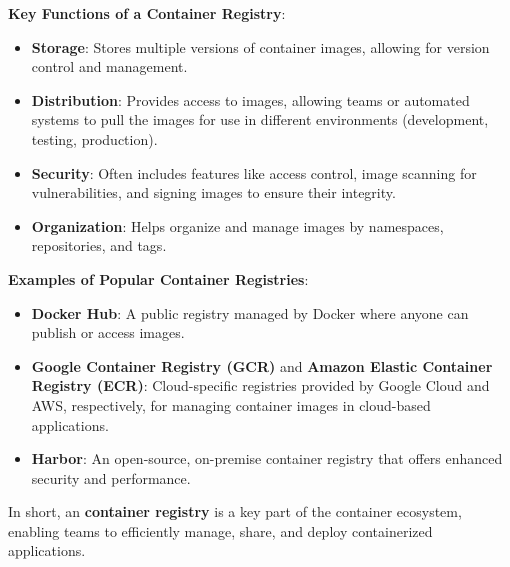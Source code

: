 \documentclass{article}
\begin{document}
\textbf{Key Functions of a Container Registry}:
\begin{itemize}
    \item \textbf{Storage}: Stores multiple versions of container images, allowing for version control and management.
    \item \textbf{Distribution}: Provides access to images, allowing teams or automated systems to pull the images for use in different environments (development, testing, production).
    \item \textbf{Security}: Often includes features like access control, image scanning for vulnerabilities, and signing images to ensure their integrity.
    \item \textbf{Organization}: Helps organize and manage images by namespaces, repositories, and tags.
\end{itemize}
    
\textbf{Examples of Popular Container Registries}:
\begin{itemize}
    \item \textbf{Docker Hub}: A public registry managed by Docker where anyone can publish or access images.
    \item \textbf{Google Container Registry (GCR)} and \textbf{Amazon Elastic Container Registry (ECR)}: Cloud-specific registries provided by Google Cloud and AWS, respectively, for managing container images in cloud-based applications.
    \item \textbf{Harbor}: An open-source, on-premise container registry that offers enhanced security and performance.
\end{itemize}

In short, an \textbf{container registry} is a key part of the container ecosystem, enabling teams to efficiently manage, share, and deploy containerized applications.
\end{document}
